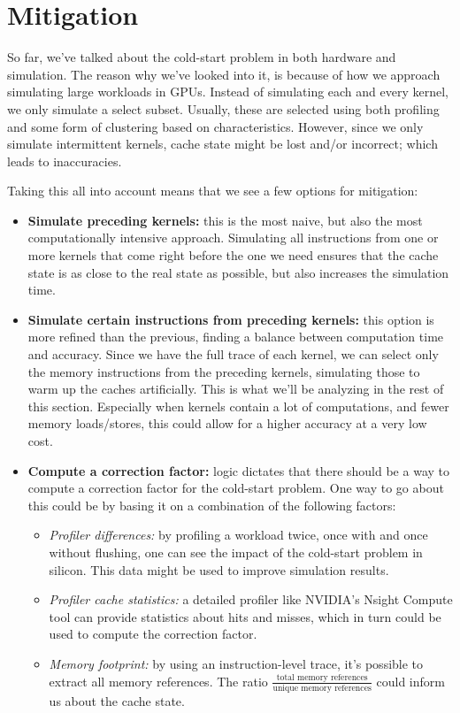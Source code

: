 \chapter{Mitigation}\label{ch:mitigation}

So far, we've talked about the cold-start problem in both hardware and simulation.
The reason why we've looked into it, is because of how we approach simulating large workloads in GPUs.
Instead of simulating each and every kernel, we only simulate a select subset.
Usually, these are selected using both profiling and some form of clustering based on characteristics.
However, since we only simulate intermittent kernels, cache state might be lost and/or incorrect; which leads to inaccuracies.

Taking this all into account means that we see a few options for mitigation:
\begin{itemize}
    \item \textbf{Simulate preceding kernels:} this is the most naive, but also the most computationally intensive approach.
    Simulating all instructions from one or more kernels that come right before the one we need ensures that the cache state is as close to the real state as possible, but also increases the simulation time.
    \item \textbf{Simulate certain instructions from preceding kernels:} this option is more refined than the previous, finding a balance between computation time and accuracy.
    Since we have the full trace of each kernel, we can select only the memory instructions from the preceding kernels, simulating those to warm up the caches artificially.
    This is what we'll be analyzing in the rest of this section.
    Especially when kernels contain a lot of computations, and fewer memory loads/stores, this could allow for a higher accuracy at a very low cost.
    \item \textbf{Compute a correction factor:} logic dictates that there should be a way to compute a correction factor for the cold-start problem.
    One way to go about this could be by basing it on a combination of the following factors:
    \begin{itemize}
        \item \textit{Profiler differences:} by profiling a workload twice, once with and once without flushing, one can see the impact of the cold-start problem in silicon.
        This data might be used to improve simulation results.
        \item \textit{Profiler cache statistics:} a detailed profiler like NVIDIA's Nsight Compute tool can provide statistics about hits and misses, which in turn could be used to compute the correction factor.
        \item \textit{Memory footprint:} by using an instruction-level trace, it's possible to extract all memory references.
        The ratio $\frac{\text{total memory references}}{\text{unique memory references}}$ could inform us about the cache state.
    \end{itemize}
\end{itemize}

